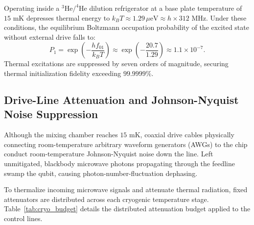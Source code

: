 \documentclass[10pt,journal,compsoc]{IEEEtran}
\begin{document}
Operating inside a $^3\text{He}/^4\text{He}$ dilution refrigerator at a base plate temperature of $15\text{ mK}$ depresses thermal energy to $k_B T \approx 1.29\,\mu\text{eV} \approx h \times 312\text{ MHz}$. Under these conditions, the equilibrium Boltzmann occupation probability of the excited state without external drive falls to:
\begin{equation}
P_1 = \exp\left(-\frac{h f_{01}}{k_B T}\right) \approx \exp\left(-\frac{20.7}{1.29}\right) \approx 1.1 \times 10^{-7}.
\end{equation}
Thermal excitations are suppressed by seven orders of magnitude, securing thermal initialization fidelity exceeding $99.9999\%$.

\subsection{Drive-Line Attenuation and Johnson-Nyquist Noise Suppression}
Although the mixing chamber reaches $15\text{ mK}$, coaxial drive cables physically connecting room-temperature arbitrary waveform generators (AWGs) to the chip conduct room-temperature Johnson-Nyquist noise down the line. Left unmitigated, blackbody microwave photons propagating through the feedline swamp the qubit, causing photon-number-fluctuation dephasing.

To thermalize incoming microwave signals and attenuate thermal radiation, fixed attenuators are distributed across each cryogenic temperature stage. Table~\ref{tab:cryo_budget} details the distributed attenuation budget applied to the control lines.

\begin{table}[!ht]
\centering
\caption{Cryogenic Thermal Staging and Drive-Line Attenuation Budget}
\label{tab:cryo_budget}
\end{table}
\end{document}
